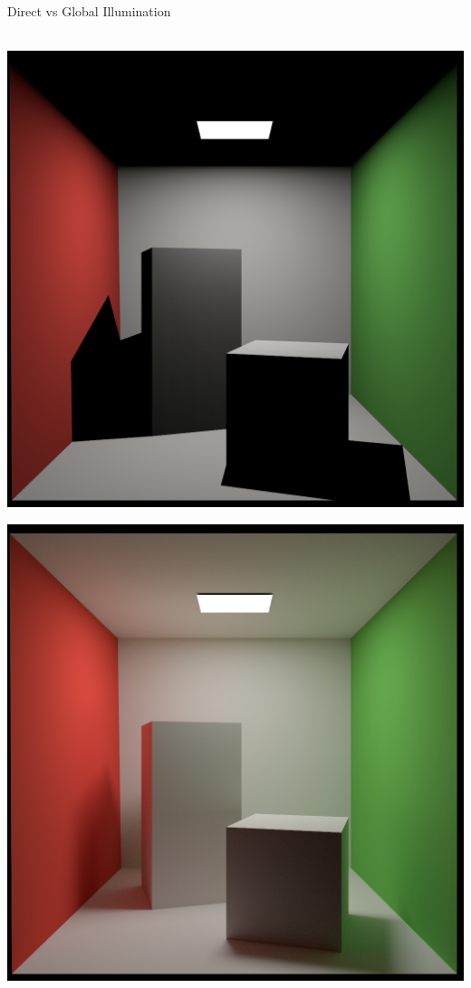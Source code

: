 \documentclass[utf8,stillsansserifmath,fleqn,t]{beamer}
\begin{document}
\begin{frame}
\frametitle{\insertsection}
Direct vs Global Illumination\\~\\
\begin{minipage}{.48\textwidth}
\includegraphics[width=\textwidth]{./fig/cornellbox-direct.png}
\end{minipage}\hfill
\begin{minipage}{.48\textwidth}
\includegraphics[width=\textwidth]{./fig/cornellbox-pathtracing.png}
\end{minipage}
\end{frame}
\end{document}
